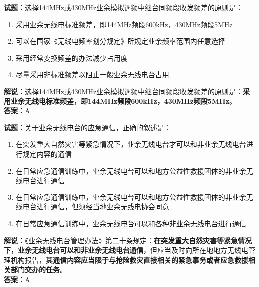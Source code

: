 \documentclass{ctexbook}
\begin{document}
\bigskip


\noindent\textbf{试题：}选择144\unit{\MHz}或430\unit{\MHz}业余模拟调频中继台同频段收发频差的原则是：
\begin{enumerate}[leftmargin=3em]
\item 采用业余无线电标准频差，即144\unit{\MHz}频段600\unit{\kHz}，430\unit{\MHz}频段5\unit{\MHz}
\item 可以在国家《无线电频率划分规定》所规定业余频率范围内任意选择
\item 采用经常变换频差的办法减少占用度
\item 尽量采用非标准频差以阻止一般业余无线电台占用
\end{enumerate}
\noindent\textbf{解说：}选择144\unit{\MHz}或430\unit{\MHz}业余模拟调频中继台同频段收发频差的原则是：\textbf{采用业余无线电标准频差，即144\unit{\MHz}频段600\unit{\kHz}，430\unit{\MHz}频段5\unit{\MHz}}。\\\noindent\textbf{答案：}A

\bigskip


\noindent\textbf{试题：}关于业余无线电台的应急通信，正确的叙述是：
\begin{enumerate}[leftmargin=3em]
\item 在突发重大自然灾害等紧急情况下，业余无线电台才可以和非业余无线电台进行规定内容的通信
\item 在日常应急通信训练中，业余无线电台可以和地方公益性救援团体的非业余无线电台进行通信
\item 在日常应急通信训练中，业余无线电台可以和地方公益性救援团体的非业余无线电台进行通信，但须经当地业余无线电协会同意
\item 在日常应急通信训练中，业余无线电台可以和各种非业余无线电台进行通信
\end{enumerate}
\noindent\textbf{解说：}《业余无线电台管理办法》第二十条规定：\textbf{在突发重大自然灾害等紧急情况下，业余无线电台可以和非业余无线电台通信}，但应当及时向所在地地方无线电管理机构报告，\textbf{其通信内容应当限于与抢险救灾直接相关的紧急事务或者应急救援相关部门交办的任务}。\\\noindent\textbf{答案：}A



\bigskip
\end{document}
